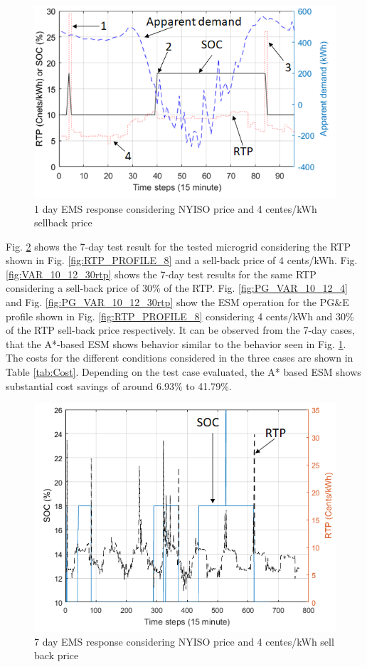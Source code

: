  \begin{figure}[!ht]
    \centering
    \includegraphics[width = \linewidth]{figs/VAR_1_day_example.png}
    \caption{1 day EMS response considering NYISO price and 4 centes/kWh sellback price}
    \label{fig:VAR_1_day_example}
\end{figure}

Fig. \ref{fig:VAR_10_12_4} shows the 7-day test result for the tested microgrid considering the RTP shown in Fig. \ref{fig:RTP_PROFILE_8} and a sell-back price of 4 cents/kWh. Fig. \ref{fig:VAR_10_12_30rtp} shows the 7-day test results for the same RTP considering a sell-back price of 30\% of the RTP. Fig. \ref{fig:PG_VAR_10_12_4} and Fig. \ref{fig:PG_VAR_10_12_30rtp} show the ESM operation for the PG\&E profile shown in Fig. \ref{fig:RTP_PROFILE_8} considering 4 cents/kWh and 30\% of the RTP sell-back price respectively. It can be observed from the 7-day cases, that the A*-based ESM shows behavior similar to the behavior seen in  Fig. \ref{fig:VAR_1_day_example}. The costs for the different conditions considered in the three cases are shown in Table \ref{tab:Cost}. Depending on the test case evaluated, the A* based ESM shows substantial cost savings of around 6.93\% to 41.79\%. 

 \begin{figure}[!ht]
    \centering
    \includegraphics[width = \linewidth]{figs/VAR_10_12_4.png}
    \caption{7 day EMS response considering NYISO price and 4 centes/kWh sell back price}
    \label{fig:VAR_10_12_4}
\end{figure}

